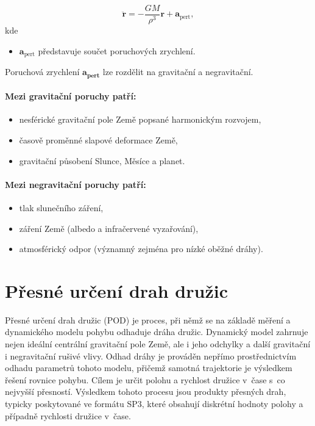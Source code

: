 \begin{equation}
\ddot{\mathbf{r}} = -\frac{GM}{\rho^3}\mathbf{r} + \mathbf{a}_{\text{pert}},
\end{equation}
kde 
\begin{itemize}
    \item $\mathbf{a}_{\text{pert}}$ představuje součet poruchových zrychlení.
\end{itemize}
Poruchová zrychlení \(\mathbf{a_{pert}}\) lze rozdělit na gravitační a negravitační. 

\paragraph{Mezi gravitační poruchy patří:}
\begin{itemize}
\item nesférické gravitační pole Země popsané harmonickým rozvojem,
\item časově proměnné slapové deformace Země,
\item gravitační působení Slunce, Měsíce a planet.
\end{itemize}

\paragraph{Mezi negravitační poruchy patří:}
\begin{itemize}
\item tlak slunečního záření,
\item záření Země (albedo a infračervené vyzařování),
\item atmosférický odpor (významný zejména pro nízké oběžné dráhy).
\end{itemize}

\section{Přesné určení drah družic}

Přesné určení drah družic (POD) je proces, při němž se na základě měření a dynamického modelu pohybu odhaduje dráha družic. Dynamický model zahrnuje nejen ideální centrální gravitační pole Země, ale i jeho odchylky a další gravitační i negravitační rušivé vlivy.  Odhad dráhy je prováděn nepřímo prostřednictvím odhadu parametrů tohoto modelu, přičemž samotná trajektorie je výsledkem řešení rovnice pohybu. Cílem je určit polohu a rychlost družice v~čase s~co nejvyšší přesností. Výsledkem tohoto procesu jsou produkty přesných drah, typicky poskytované ve formátu SP3, které obsahují diskrétní hodnoty polohy a případně rychlosti družice v~čase.

